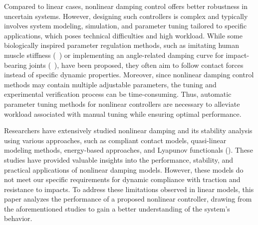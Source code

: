 Compared to linear cases, nonlinear damping control offers better robustness in uncertain systems. However, designing such controllers is complex and typically involves system modeling, simulation, and parameter tuning tailored to specific applications, which poses technical difficulties and high workload. While some biologically inspired parameter regulation methods, such as imitating human muscle stiffness (~\cite{al2018active}) or implementing an angle-related damping curve for impact-bearing joints (~\cite{hamid2021state}), have been proposed, they often aim to follow contact forces instead of specific dynamic properties. Moreover, since nonlinear damping control methods may contain multiple adjustable parameters, the tuning and experimental verification process can be time-consuming. Thus, automatic parameter tuning methods for nonlinear controllers are necessary to alleviate workload associated with manual tuning while ensuring optimal performance.



Researchers have extensively studied nonlinear damping and its stability analysis using various approaches, such as compliant contact models, quasi-linear modeling methods, energy-based approaches, and Lyapunov functionals (\cite{61008,798060,marx2019stability,colonnese2016stability,elliott2015nonlinear}). These studies have provided valuable insights into the performance, stability, and practical applications of nonlinear damping models. However, these models do not meet our specific requirements for dynamic compliance with traction and resistance to impacts. To address these limitations observed in linear models, this paper analyzes the performance of a proposed nonlinear controller, drawing from the aforementioned studies to gain a better understanding of the system's behavior.



